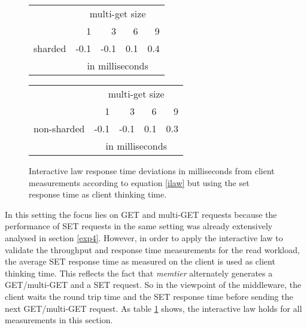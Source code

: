 \documentclass[report.tex]{subfiles}
\begin{document}
\begin{figure}[H]
	\begin{minipage}[c]{0.45\linewidth}
		\centering
		\scriptsize{
		\setlength{\tabcolsep}{4.5pt}
		\begin{tabular}{|c|*{4}{r}|}
			\cline{2-5}
			\multicolumn{1}{c|}{} & \multicolumn{4}{c|}{multi-get size} \Tstrut\\
			\multicolumn{1}{c|}{} & 1 & 3 & 6 & 9 \Tstrut\\
			\hline
			sharded & -0.1 & -0.1 & 0.1 & 0.4 \Tstrut\\
			& \multicolumn{4}{c|}{in milliseconds} \\
			\hline 
		\end{tabular}}
	\end{minipage}
	\hspace{0.5cm}
	\begin{minipage}[c]{0.45\linewidth}
		\centering
		\scriptsize{
		\setlength{\tabcolsep}{4.5pt}
		\begin{tabular}{|c|*{4}{r}|}
			\cline{2-5}
			\multicolumn{1}{c|}{} & \multicolumn{4}{c|}{multi-get size} \Tstrut\\
			\multicolumn{1}{c|}{} & 1 & 3 & 6 & 9 \Tstrut\\
			\hline
			non-sharded & -0.1 & -0.1 & 0.1 & 0.3 \Tstrut\\
			& \multicolumn{4}{c|}{in milliseconds} \\
			\hline 
		\end{tabular}
	}
	\end{minipage}
	\caption{Interactive law response time deviations in milliseconds from client measurements according to equation \ref{ilaw} but using the set response time as client thinking time.}\label{exp5_ilaw}
\end{figure}


In this setting the focus lies on GET and multi-GET requests because the performance of SET requests in the same setting was already extensively analysed in section \ref{exp4}.
However, in order to apply the interactive law to validate the throughput and response time measurements for the read workload, the average SET response time as measured on the client is used as client thinking time. This reflects the fact that \emph{memtier} alternately generates a GET/multi-GET and a SET request. So in the viewpoint of the middleware, the client waits the round trip time and the SET response time before sending the next GET/multi-GET request. As table \ref{exp5_ilaw} shows, the interactive law holds for all measurements in this section.
\end{document}
